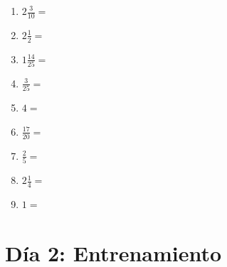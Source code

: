 \documentclass[12pt]{article}
\begin{document}
\begin{enumerate}
\item \large $ 2 \frac{3}{10} = $ \vspace{1.5cm}
\item \large $ 2 \frac{1}{2} = $ \vspace{1.5cm}
\item \large $ 1 \frac{14}{25} = $ \vspace{1.5cm}
\item \large $ \frac{3}{25} = $ \vspace{1.5cm}
\item \large $ 4 = $ \vspace{1.5cm}
\item \large $ \frac{17}{20} = $ \vspace{1.5cm}
\item \large $ \frac{2}{5} = $ \vspace{1.5cm}
\item \large $ 2 \frac{1}{4} = $ \vspace{1.5cm}
\item \large $ 1 = $ \vspace{1.5cm}
\end{enumerate}\newpage
\section*{Día 2: Entrenamiento}
\end{document}
